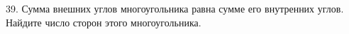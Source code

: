 39. Сумма внешних углов многоугольника равна сумме его внутренних углов. Найдите число сторон этого многоугольника.\\
